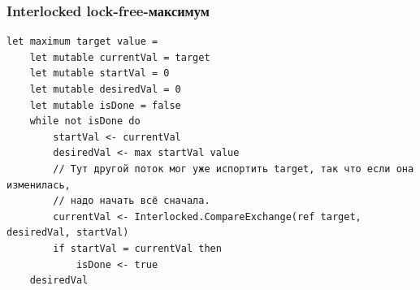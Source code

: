 \documentclass[xetex,mathserif,serif]{beamer}
\begin{document}
	\begin{frame}[fragile]
		\frametitle{Interlocked lock-free-максимум}
		\begin{footnotesize}
			\begin{verbatim}
let maximum target value =
    let mutable currentVal = target
    let mutable startVal = 0
    let mutable desiredVal = 0
    let mutable isDone = false
    while not isDone do
        startVal <- currentVal
        desiredVal <- max startVal value
        // Тут другой поток мог уже испортить target, так что если она изменилась,
        // надо начать всё сначала.
        currentVal <- Interlocked.CompareExchange(ref target, desiredVal, startVal)
        if startVal = currentVal then
            isDone <- true
    desiredVal
			\end{verbatim}
		\end{footnotesize}
	\end{frame}
\end{document}
